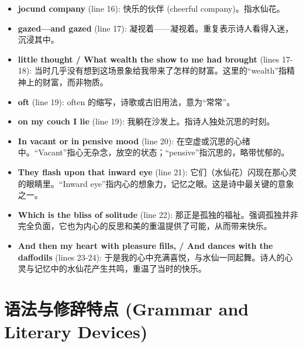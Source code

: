 \documentclass[12pt, a4paper]{article}
\begin{document}
\begin{itemize}
    \item \textbf{jocund company} (line 16): 快乐的伙伴 (cheerful company)。指水仙花。
    \item \textbf{gazed—and gazed} (line 17): 凝视着——凝视着。重复表示诗人看得入迷，沉浸其中。
    \item \textbf{little thought / What wealth the show to me had brought} (lines 17-18): 当时几乎没有想到这场景象给我带来了怎样的财富。这里的“wealth”指精神上的财富，而非物质。
    \item \textbf{oft} (line 19): often 的缩写，诗歌或古旧用法，意为“常常”。
    \item \textbf{on my couch I lie} (line 19): 我躺在沙发上。指诗人独处沉思的时刻。
    \item \textbf{In vacant or in pensive mood} (line 20): 在空虚或沉思的心绪中。“Vacant”指心无杂念，放空的状态；“pensive”指沉思的，略带忧郁的。
    \item \textbf{They flash upon that inward eye} (line 21): 它们（水仙花）闪现在那心灵的眼睛里。“Inward eye”指内心的想象力，记忆之眼。这是诗中最关键的意象之一。
    \item \textbf{Which is the bliss of solitude} (line 22): 那正是孤独的福祉。强调孤独并非完全负面，它也为内心的反思和美的重温提供了可能，从而带来快乐。
    \item \textbf{And then my heart with pleasure fills, / And dances with the daffodils} (lines 23-24): 于是我的心中充满喜悦，与水仙一同起舞。诗人的心灵与记忆中的水仙花产生共鸣，重温了当时的快乐。
\end{itemize}

\section{语法与修辞特点 (Grammar and Literary Devices)}
\end{document}
